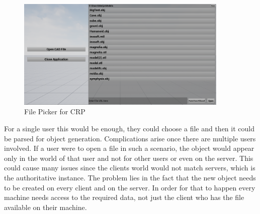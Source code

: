 \begin{figure}[htpb]
	\centering
	\includegraphics[width=0.9\textwidth]{fig/FilePicker2.png}
	\caption[CAD Runtime Presenter File Picker]{File Picker for CRP\protect}
	\label{fig:FilePicker}
\end{figure}

For a single user this would be enough, they could choose a file and then it could be parsed for object generation. Complications arise once there are multiple users involved. If a user were to open a file in such a scenario, the object would appear only in the world of that user and not for other users or even on the server. This could cause many issues since the clients world would not match servers, which is the authoritative instance. The problem lies in the fact that the new object needs to be created on every client and on the server. In order for that to happen every machine needs access to the required data, not just the client who has the file available on their machine.\\

